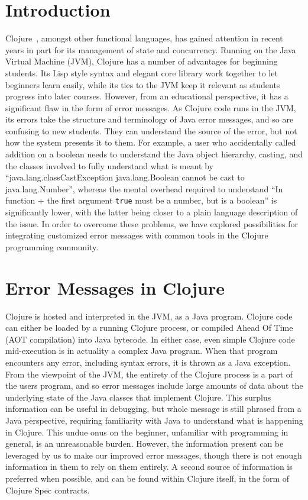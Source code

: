 \documentclass[12pt]{article}
\newcommand{\comment}[1]{{\bf \tt  {#1}}}
\newcommand{\emcomment}[1]{\textcolor{ForestGreen}{\comment{Elena: {#1}}}}
\begin{document}
\newpage
\setcounter{page}{1}

\section{Introduction}
Clojure~\cite{Hickey:2008}, amongst other functional languages, has gained attention in recent years
in part for its management of state and concurrency.
Running on the Java Virtual Machine (JVM), Clojure has a number of advantages for beginning students.
Its Lisp style syntax and elegant core library work together to let beginners learn easily, while
its ties to the JVM keep it relevant as students progress into later courses.
However, from an educational perspective, it has a significant flaw in the form of error messages.
As Clojure code runs in the JVM, its errors take the structure and terminology of Java error messages,
and so are confusing to new students. They can understand the source of the error,
but not how the system presents it to them.
For example, a user who accidentally called addition on a boolean needs
 to understand the Java object hierarchy, casting,
 and the classes involved to fully understand what is meant by
 ``java.lang.classCastException java.lang.Boolean cannot be cast to java.lang.Number'',
whereas the mental overhead required to understand
``In function + the first argument {\tt true} must be a number, but is a boolean''
 is significantly lower, with the latter being closer to a plain language
 description of the issue.
 In order to overcome these problems,
 we have explored possibilities for integrating customized error messages
 with common tools in the Clojure programming community.

\section{Error Messages in Clojure}
Clojure is hosted and interpreted in the JVM, as a Java program.
Clojure code can either be loaded by a running Clojure process, or
compiled Ahead Of Time (AOT compilation) into Java bytecode. In either case,
even simple Clojure code mid-execution is in actuality a complex Java program.
When that program encounters any error, including syntax errors, it is thrown as a Java exception.
From the viewpoint of the JVM, the entirety of the Clojure process is
a part of the users program, and so error messages include large amounts
of data about the underlying state of the Java classes that implement Clojure.
This surplus information can be useful in debugging,
but whole message is still phrased from a Java perspective, requiring familiarity with Java
to understand what is happening in Clojure.
This undue onus on the beginner,
unfamiliar with programming in general, is an unreasonable burden.
However, the information present can be leveraged by us to make our improved
error messages, though there is not enough information in them to rely on them entirely.
A second source of information is preferred when possible, and can be found within Clojure itself,
in the form of Clojure Spec contracts.
\end{document}
